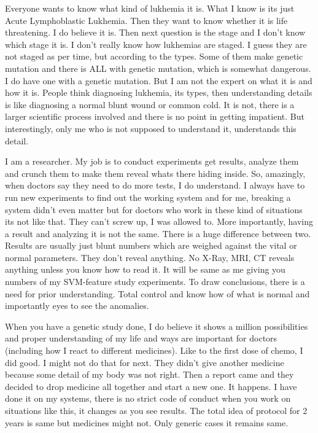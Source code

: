 Everyone wants to know what kind of lukhemia it is. What I know is its just Acute 
Lymphoblastic Lukhemia. Then they want to know whether it is life threatening. I do believe 
it is. Then next question is the stage and I don't know which stage it is. I don't really know 
how lukhemias are staged. I guess they are not staged as per time, but according to the types. 
Some of them make genetic mutation and there is ALL with genetic mutation, which is somewhat 
dangerous. I do have one with a genetic mutation. But I am not the expert on what it is and 
how it is. People think diagnosing lukhemia, its types, then understanding details is like 
diagnosing a normal blunt wound or common cold. It is not, there is a larger scientific process 
involved and there is no point in getting impatient. But interestingly, only me who is not 
supposed to understand it, understands this detail.

I am a researcher. My job is to conduct experiments get results, analyze them and crunch them 
to make them reveal whats there hiding inside. So, amazingly, when doctors say they need to do 
more tests, I do understand. I always have to run new experiments to find out the working system 
and for me, breaking a system didn't even matter but for doctors who work in these kind of 
situations its not like that. They can't screw up, I was allowed to. More importantly, having 
a result and analyzing it is not the same. There is a huge difference between two. Results are 
usually just blunt numbers which are weighed against the vital or normal parameters. They 
don't reveal anything. No X-Ray, MRI, CT reveals anything unless you know how to read it. It 
will be same as me giving you numbers of my SVM-feature study experiments. To draw conclusions, 
there is a need for prior understanding. Total control and know how of what is normal and 
importantly eyes to see the anomalies. 

When you have a genetic study done, I do believe it shows a million possibilities and proper 
understanding of my life and ways are important for doctors (including how I react to different 
medicines). Like to the first dose of chemo, I did good. I might not do that for next. They didn't
give another medicine because some detail of my body was not right. Then a report came and 
they decided to drop medicine all together and start a new one. It happens. I have done it on 
my systems, there is no strict code of conduct when you work on situations like this, it changes 
as you see results. The total idea of protocol for 2 years is same but medicines might not. Only 
generic cases it remains same. 


